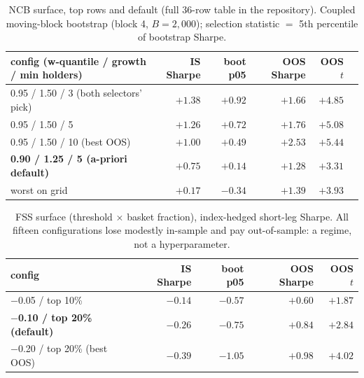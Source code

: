 \begin{table}[h]
\centering\scriptsize
\caption{NCB surface, top rows and default (full 36-row table in the
repository). Coupled moving-block bootstrap (block 4, $B=2{,}000$);
selection statistic $=$ 5th percentile of bootstrap Sharpe.}
\begin{tabular}{lrrrrr}
\toprule
config (w-quantile / growth / min holders) & IS Sharpe & boot p05 &
OOS Sharpe & OOS $t$ \\
\midrule
0.95 / 1.50 / 3 (both selectors' pick) & $+1.38$ & $+0.92$ & $+1.66$ & $+4.85$ \\
0.95 / 1.50 / 5 & $+1.26$ & $+0.72$ & $+1.76$ & $+5.08$ \\
0.95 / 1.50 / 10 (best OOS) & $+1.00$ & $+0.49$ & $+2.53$ & $+5.44$ \\
\textbf{0.90 / 1.25 / 5 (a-priori default)} & $+0.75$ & $+0.14$ & $+1.28$ & $+3.31$ \\
worst on grid & $+0.17$ & $-0.34$ & $+1.39$ & $+3.93$ \\
\bottomrule
\end{tabular}
\end{table}

\begin{table}[h]
\centering\scriptsize
\caption{FSS surface (threshold $\times$ basket fraction),
index-hedged short-leg Sharpe. All fifteen configurations lose
modestly in-sample and pay out-of-sample: a regime, not a
hyperparameter.}
\begin{tabular}{lrrrr}
\toprule
config & IS Sharpe & boot p05 & OOS Sharpe & OOS $t$ \\
\midrule
$-$0.05 / top 10\% & $-0.14$ & $-0.57$ & $+0.60$ & $+1.87$ \\
\textbf{$-$0.10 / top 20\% (default)} & $-0.26$ & $-0.75$ & $+0.84$ & $+2.84$ \\
$-$0.20 / top 20\% (best OOS) & $-0.39$ & $-1.05$ & $+0.98$ & $+4.02$ \\
\bottomrule
\end{tabular}
\end{table}

